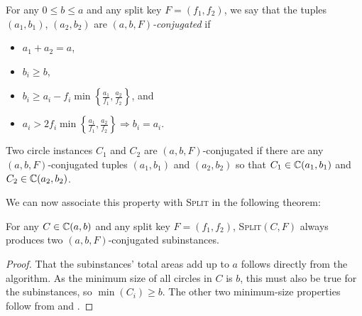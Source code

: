 \documentclass[a4paper,style=print,bibliography=totoc,nexus,lnum,extramargin]{tubsbook}
\begin{document}
\begin{definition}\label{def:conjugated}
    For any $0 \le b \le a$ and any split key $F = (f_1, f_2)$, we say that the tuples $(a_1, b_1)$, $(a_2, b_2)$ are \emph{$(a,b,F)$-conjugated} if

    \begin{itemize}
        \item $a_1 + a_2 = a$,
        \item $b_i \ge b$,
        \item $b_i \ge a_i - f_i \min\left\{\frac{a_1}{f_1}, \frac{a_2}{f_2}\right\}$, and
        \item $a_i > 2 f_i\min\left\{\frac{a_1}{f_1}, \frac{a_2}{f_2}\right\} \Rightarrow b_i = a_i$.
    \end{itemize}
\end{definition}

\begin{definition}
    Two circle instances $C_1$ and $C_2$ are $(a,b,F)$-conjugated if there are any $(a,b,F)$-conjugated tuples $(a_1, b_1)$ and $(a_2, b_2)$ so that $C_1 \in \mathbb{C}(a_1, b_1)$ and $C_2 \in \mathbb{C}(a_2, b_2)$.
\end{definition}

We can now associate this property with \textsc{Split} in the following theorem:

\begin{theorem}\label{th:split-properties}
    For any $C \in \mathbb{C}(a,b)$ and any split key $F = (f_1, f_2)$, \textsc{Split}$(C,F)$ always produces two $(a,b,F)$-conjugated subinstances.
\end{theorem}

\begin{proof}
    That the subinstances' total areas add up to $a$ follows directly from the algorithm.
    As the minimum size of all circles in $C$ is $b$, this must also be true for the subinstances, so $\min(C_i) \ge b$.
    The other two minimum-size properties follow from  and .
\end{proof}
\end{document}
